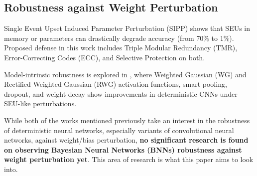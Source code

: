 \documentclass[ %
                    author={Revalda Putawara},
                supervisor={Dr. James Pope},
                    degree={MSc},
                     title={Robustness of Bayesian Neural Networks Design Choices Against Weight and Bias Perturbation Induced by Single Event Upsets (SEUs)},
                      type={},
                      year={2025}]{dissertation}
\begin{document}
\subsection{Robustness against Weight Perturbation}


Single Event Upset Induced Parameter Perturbation (SIPP) \cite{yan_2020a} shows that SEUs in memory or parameters can drastically degrade accuracy (from 70\% to 1\%). Proposed defense in this work includes Triple Modular Redundancy (TMR), Error-Correcting Codes (ECC), and Selective Protection on both.


Model-intrinsic robustness is explored in \cite{dennispoperobustcnn}, where Weighted Gaussian (WG) and Rectified Weighted Gaussian (RWG) activation functions, smart pooling, dropout, and weight decay show improvements in deterministic CNNs under SEU-like perturbations.

While both of the works mentioned previously take an interest in the robustness of deterministic neural networks, especially variants of convolutional neural networks, against weight/bias perturbation, \textbf{no significant research is found on observing Bayesian Neural Networks (BNNs) robustness against weight perturbation yet}. This area of research is what this paper aims to look into.
\end{document}
